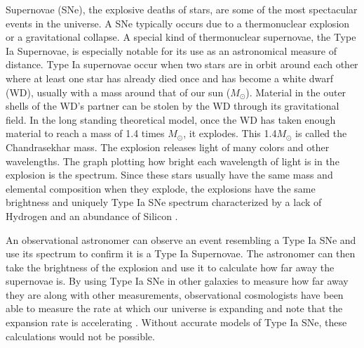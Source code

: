 \documentclass[preprint]{aastex62}
\begin{document}

  Supernovae (SNe), the explosive deaths of stars, are some of the most spectacular events in the universe. A SNe typically occurs due to a thermonuclear explosion or a gravitational collapse. A special kind of  thermonuclear supernovae, the Type Ia Supernovae, is especially notable for its use as an astronomical measure of distance. Type Ia supernovae occur when two stars are in orbit around each other where at least one star has already died once and has become a white dwarf (WD), usually with a mass around that of our sun ($M_{\odot}$). Material in the outer shells of the WD's partner can be stolen by the WD through its gravitational field. In the long standing theoretical model, once the WD has taken enough material to reach a mass of 1.4 times $M_{\odot}$, it explodes. This 1.4$M_{\odot}$ is called the Chandrasekhar mass. The explosion releases light of many colors and other wavelengths. The graph plotting how bright each wavelength of light is in the explosion is the spectrum. Since these stars usually have the same mass and elemental composition when they explode, the explosions have the same brightness and uniquely Type Ia SNe spectrum characterized by a lack of Hydrogen and an abundance of Silicon \citep{SNeSpectra}. 
  
  An observational astronomer can observe an event resembling a Type Ia SNe and use its spectrum to confirm it is a Type Ia Supernovae. The astronomer can then take the brightness of the explosion and use it to calculate how far away the supernovae is. By using Type Ia SNe in other galaxies to measure how far away they are along with other measurements, observational cosmologists have been able to measure the rate at which our universe is expanding and note that the expansion rate is accelerating \citep{acceleratingUniverse1, acceleratingUniverse2}. Without accurate models of Type Ia SNe, these calculations would not be possible. 
  
\end{document}
